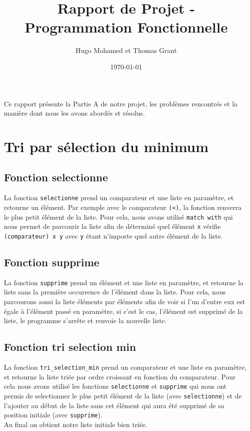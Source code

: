 \documentclass[a4paper, 11pt]{article}
\title{Rapport de Projet - Programmation Fonctionnelle}
\author{Hugo Mohamed et Thomas Grant}
\date{\today}
\begin{document}
\maketitle

\begin{center}

Ce rapport présente la Partie A de notre projet, les problèmes rencontrés et la manière dont nous les avons abordés et résolus.

\end{center} 


\newpage
\tableofcontents
\newpage

\section{Tri par sélection du minimum}
\subsection{Fonction selectionne}
La fonction \texttt{selectionne} prend un comparateur et une liste en paramètre, et retourne un élément. Par exemple avec le comparateur \texttt{(<)}, la fonction renverra le plus petit élément de la liste.
Pour cela, nous avons utilisé \texttt{match with} qui nous permet de parcourir la liste afin de déterminé quel élément \texttt{x} vérifie \texttt{(comparateur) x y} avec \texttt{y} étant n'importe quel autre élément de la liste.
\subsection{Fonction supprime}
La fonction \texttt{supprime} prend un élément et une liste en paramètre, et retourne la liste sans la première occurrence de l'élément dans la liste. Pour cela, nous parcourons aussi la liste éléments par éléments afin de voir si l'un d'entre eux est égale à l'élément passé en paramètre, si c'est le cas, l'élément est supprimé de la liste, le programme s'arrête et renvoie la nouvelle liste.
\subsection{Fonction tri selection min}
La fonction \texttt{tri\_selection\_min} prend un comparateur et une liste en paramètre, et retourne la liste triée par ordre croissant en fonction du comparateur. Pour cela nous avons utilisé les fonctions \texttt{selectionne} et \texttt{supprime} qui nous ont permis de selectionner le plus petit élément de la liste (avec \texttt{selectionne}) et de l'ajouter au début de la liste sans cet élément qui aura été supprimé de sa position initiale (avec \texttt{supprime}).\\
Au final on obtient notre liste initiale bien triée.
\end{document}
